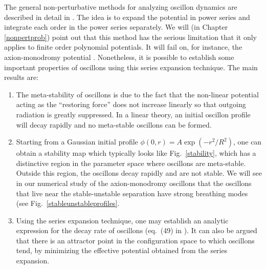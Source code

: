 \documentclass[11pt]{book}
\begin{document}
The general non-perturbative methods for analyzing oscillon dynamics are described in detail in \cite{Copeland:1995fq, PhysRevD.80.125037, Gleiser:2008ty}. The idea is to expand the potential in power series and integrate each order in the power series separately. We will (in Chapter \ref{nonpertprob}) point out that this method has the serious limitation that it only applies to finite order polynomial potentials. It will fail on, for instance, the axion-monodromy potential \cite{McAllister:2008hb, Silverstein:2008sg, Flauger:2009ab}. Nonetheless, it is possible to establish some important properties of oscillons using this series expansion technique. The main results are:
\begin{enumerate}
\item The meta-stability of oscillons is due to the fact that the non-linear potential acting as the ``restoring force'' does not increase linearly so that outgoing radiation is greatly suppressed. In a linear theory, an initial oscillon profile will decay rapidly and no meta-stable oscillons can be formed.
\item Starting from a Gaussian initial profile $\phi(0,r)=A\exp(-r^2/R^2)$, one can obtain a stability map which typically looks like Fig.~\ref{stability}, which has a distinctive region in the parameter space where oscillons are meta-stable. Outside this region, the oscillons decay rapidly and are not stable. We will see in our numerical study of the axion-monodromy oscillons that the oscillons that live near the stable-unstable separation have strong breathing modes (see Fig.~\ref{stableunstableprofiles}.
\item Using the series expansion technique, one may establish an analytic expression for the decay rate of oscillons (eq.~(49) in \cite{PhysRevD.80.125037}). It can also be argued that there is an attractor point in the configuration space to which oscillons tend, by minimizing the effective potential obtained from the series expansion.
\end{enumerate}
\end{document}
